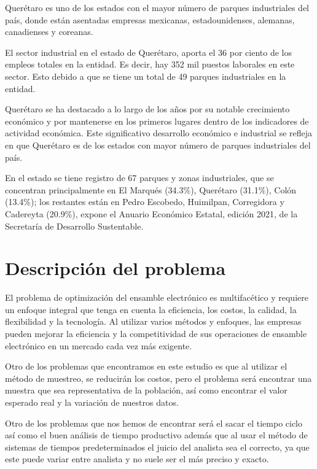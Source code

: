         Querétaro es uno de los estados con el mayor número de parques industriales del país, donde están asentadas empresas mexicanas, estadounidenses, alemanas, canadienses y coreanas.
        
        El sector industrial en el estado de Querétaro, aporta el 36 por ciento de los empleos totales en la entidad. Es decir, hay 352 mil puestos laborales en este sector. Esto debido a que se tiene un total de 49 parques industriales en la entidad.
        
        Querétaro se ha destacado a lo largo de los años por su notable crecimiento económico y por mantenerse en los primeros lugares dentro de los indicadores de actividad económica. Este significativo desarrollo económico e industrial se refleja en que Querétaro es de los estados con mayor número de parques industriales del país. \cite{JessicaIgnot}
        
        En el estado se tiene registro de 67 parques y zonas industriales, que se concentran principalmente en El Marqués (34.3\%), Querétaro (31.1\%), Colón (13.4\%); los restantes están en Pedro Escobedo, Huimilpan, Corregidora y Cadereyta (20.9\%), expone el Anuario Económico Estatal, edición 2021, de la Secretaría de Desarrollo Sustentable.
    
    \section{Descripción del problema}
    
    El problema de optimización del ensamble electrónico es multifacético y requiere un enfoque integral que tenga en cuenta la eficiencia, los costos, la calidad, la flexibilidad y la tecnología. Al utilizar varios métodos y enfoques, las empresas pueden mejorar la eficiencia y la competitividad de sus operaciones de ensamble electrónico en un mercado cada vez más exigente.
    
    Otro de los problemas que encontramos en este estudio es que al utilizar el método de muestreo, se reducirán los costos, pero el problema será encontrar una muestra que sea representativa de la población, así como encontrar el valor esperado real y la variación de nuestros datos.
    
    Otro de los problemas que nos hemos de encontrar será el sacar el tiempo ciclo así como el buen análisis de tiempo productivo además que al usar el método de sistemas de tiempos predeterminados el juicio del analista sea el correcto, ya que este puede variar entre analista y no suele ser el más preciso y exacto.
    
